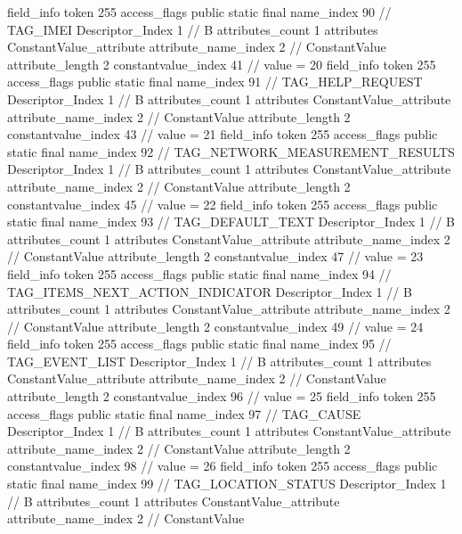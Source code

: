 {{{{{{				}
			}
			field_info {
				token	255
				access_flags	public static final
				name_index	90		// TAG_IMEI
				Descriptor_Index	1		// B
				attributes_count	1
				attributes {
				ConstantValue_attribute {
					attribute_name_index	2		// ConstantValue
					attribute_length	2
					constantvalue_index	41		// value = 20
				}
				}
			}
			field_info {
				token	255
				access_flags	public static final
				name_index	91		// TAG_HELP_REQUEST
				Descriptor_Index	1		// B
				attributes_count	1
				attributes {
				ConstantValue_attribute {
					attribute_name_index	2		// ConstantValue
					attribute_length	2
					constantvalue_index	43		// value = 21
				}
				}
			}
			field_info {
				token	255
				access_flags	public static final
				name_index	92		// TAG_NETWORK_MEASUREMENT_RESULTS
				Descriptor_Index	1		// B
				attributes_count	1
				attributes {
				ConstantValue_attribute {
					attribute_name_index	2		// ConstantValue
					attribute_length	2
					constantvalue_index	45		// value = 22
				}
				}
			}
			field_info {
				token	255
				access_flags	public static final
				name_index	93		// TAG_DEFAULT_TEXT
				Descriptor_Index	1		// B
				attributes_count	1
				attributes {
				ConstantValue_attribute {
					attribute_name_index	2		// ConstantValue
					attribute_length	2
					constantvalue_index	47		// value = 23
				}
				}
			}
			field_info {
				token	255
				access_flags	public static final
				name_index	94		// TAG_ITEMS_NEXT_ACTION_INDICATOR
				Descriptor_Index	1		// B
				attributes_count	1
				attributes {
				ConstantValue_attribute {
					attribute_name_index	2		// ConstantValue
					attribute_length	2
					constantvalue_index	49		// value = 24
				}
				}
			}
			field_info {
				token	255
				access_flags	public static final
				name_index	95		// TAG_EVENT_LIST
				Descriptor_Index	1		// B
				attributes_count	1
				attributes {
				ConstantValue_attribute {
					attribute_name_index	2		// ConstantValue
					attribute_length	2
					constantvalue_index	96		// value = 25
				}
				}
			}
			field_info {
				token	255
				access_flags	public static final
				name_index	97		// TAG_CAUSE
				Descriptor_Index	1		// B
				attributes_count	1
				attributes {
				ConstantValue_attribute {
					attribute_name_index	2		// ConstantValue
					attribute_length	2
					constantvalue_index	98		// value = 26
				}
				}
			}
			field_info {
				token	255
				access_flags	public static final
				name_index	99		// TAG_LOCATION_STATUS
				Descriptor_Index	1		// B
				attributes_count	1
				attributes {
				ConstantValue_attribute {
					attribute_name_index	2		// ConstantValue
}}}}}}}
